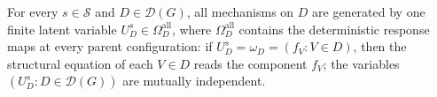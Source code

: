 For every \(s\in\mathcal S\) and \(D\in\mathcal D(G)\), all mechanisms on \(D\) are generated by one finite latent variable \(U_D^s\in\Omega_D^{\mathrm{all}}\), where \(\Omega_D^{\mathrm{all}}\) contains the deterministic response maps at every parent configuration: if \(U_D^s=\omega_D=(f_V:V\in D)\), then the structural equation of each \(V\in D\) reads the component \(f_V\); the variables \((U_D^s:D\in\mathcal D(G))\) are mutually independent.